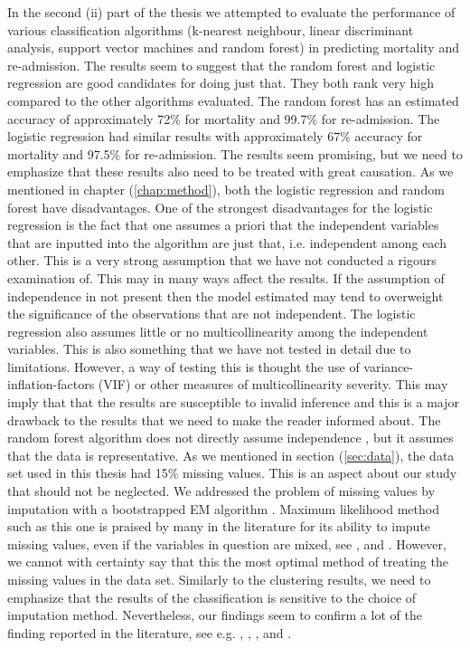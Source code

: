 \documentclass[../thesis.tex]{subfiles}
\begin{document}
\indent In the second (ii) part of the thesis we attempted to evaluate the performance of various classification algorithms (k-nearest neighbour, linear discriminant analysis, support vector machines and random forest) in predicting mortality and re-admission. The results seem to suggest that the random forest and logistic regression are good candidates for doing just that. They both rank very high compared to the other algorithms evaluated. The random forest has an estimated accuracy of approximately 72\% for mortality and 99.7\% for re-admission. The logistic regression had similar results with approximately 67\% accuracy for mortality and 97.5\% for re-admission. The results seem promising, but we need to emphasize that these results also need to be treated with great causation. As we mentioned in chapter (\ref{chap:method}), both the logistic regression and random forest have disadvantages. One of the strongest disadvantages for the logistic regression is the fact that one assumes a priori that the independent variables that are inputted into the algorithm are just that, i.e. independent among each other. This is a very strong assumption that we have not conducted a rigours examination of. This may in many ways affect the results. If the assumption of independence in not present then the model estimated may tend to overweight the significance of the observations that are not independent. The logistic regression also assumes little or no multicollinearity among the independent variables. This is also something that we have not tested in detail due to limitations. However, a way of testing this is thought the use of variance-inflation-factors (VIF) or other measures of multicollinearity severity. This may imply that that the results are susceptible to invalid inference and this is a major drawback to the results that we need to make the reader informed about. The random forest algorithm does not directly assume independence \citep{friedman2009elements}, but it assumes that the data is representative. As we mentioned in section (\ref{sec:data}), the data set used in this thesis had 15\% missing values. This is an aspect about our study that should not be neglected. We addressed the problem of missing values by imputation with a bootstrapped EM algorithm \citep{honaker2011amelia}. Maximum likelihood method such as this one is praised by many in the literature for its ability to impute missing values, even if the variables in question are mixed, see \cite{schafer1997analysis}, \cite{schafer1998multiple} and \cite{allison1999missing}. However, we cannot with certainty say that this the most optimal method of treating the missing values in the data set. Similarly to the clustering results, we need to emphasize that the results of the classification is sensitive to the choice of imputation method. Nevertheless, our findings seem to confirm a lot of the finding reported in the literature, see e.g. \cite{austin2012regression}, \cite{zolfaghar2013big}, \cite{shah2014phenomapping}, \cite{panahiazar2015using} and \cite{koulaouzidis2016telemonitoring}.\\
\end{document}
